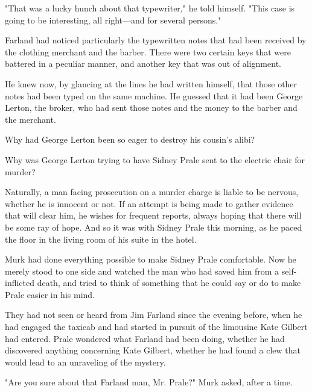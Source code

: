 \documentclass{novel}
\begin{document}
"That was a lucky hunch about that typewriter," he told himself. "This case is going to be interesting, all right---and for several persons."

Farland had noticed particularly the typewritten notes that had been received by the clothing merchant and the barber. There were two certain keys that were battered in a peculiar manner, and another key that was out of alignment.

He knew now, by glancing at the lines he had written himself, that those other notes had been typed on the same machine. He guessed that it had been George Lerton, the broker, who had sent those notes and the money to the barber and the merchant.

Why had George Lerton been so eager to destroy his cousin's alibi?

Why was George Lerton trying to have Sidney Prale sent to the electric chair for murder?

\vspace{2\nbs}
\clearpage
\thispagestyle{empty}

\begin{ChapterStart}
\vspace{3\nbs}
\end{ChapterStart}
    
Naturally, a man facing prosecution on a murder charge is liable to be nervous, whether he is innocent or not. If an attempt is being made to gather evidence that will clear him, he wishes for frequent reports, always hoping that there will be some ray of hope. And so it was with Sidney Prale this morning, as he paced the floor in the living room of his suite in the hotel.

Murk had done everything possible to make Sidney Prale comfortable. Now he merely stood to one side and watched the man who had saved him from a self-inflicted death, and tried to think of something that he could say or do to make Prale easier in his mind.

They had not seen or heard from Jim Farland since the evening before, when he had engaged the taxicab and had started in pursuit of the limousine Kate Gilbert had entered. Prale wondered what Farland had been doing, whether he had discovered anything concerning Kate Gilbert, whether he had found a clew that would lead to an unraveling of the mystery.

"Are you sure about that Farland man, Mr. Prale?" Murk asked, after a time.
\end{document}
